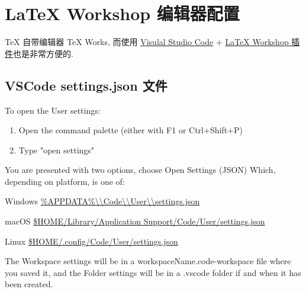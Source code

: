 \chapter{{\LaTeX} Workshop 编辑器配置}

{\TeX} 自带编辑器 {\TeX} Works, 而使用 \href{https://code.visualstudio.com/}{Visulal Studio Code} +
\href{https://github.com/James-Yu/LaTeX-Workshop}{{\LaTeX} Workshop 插件}也是非常方便的.

\section{VSCode settings.json 文件}

To open the User settings:

\begin{enumerate}
    \item Open the command palette (either with F1 or Ctrl+Shift+P)
    \item Type "open settings"
\end{enumerate}

You are presented with two options, choose Open Settings (JSON)
Which, depending on platform, is one of:
\begin{compactitems}
    \item Windows \url{\%APPDATA\%\\Code\\User\\settings.json}
    \item macOS \url{$HOME/Library/Application Support/Code/User/settings.json}
    \item Linux \url{$HOME/.config/Code/User/settings.json}
\end{compactitems}

The Workspace settings will be in a {workspaceName}.code-workspace file where you saved it, and the Folder settings will be in a .vscode folder if and when it has been created.

